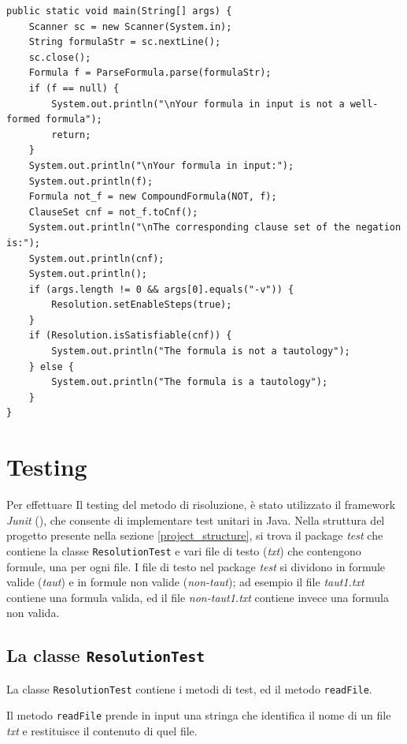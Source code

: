 \documentclass[a4paper,12pt]{report}
\begin{document}
\begin{minipage}{\linewidth}
    \small
    \begin{lstlisting}[caption={Metodo \texttt{main} della classe \texttt{App}}, label={method:main}]
public static void main(String[] args) {
    Scanner sc = new Scanner(System.in);
    String formulaStr = sc.nextLine();
    sc.close();
    Formula f = ParseFormula.parse(formulaStr);
    if (f == null) {
        System.out.println("\nYour formula in input is not a well-formed formula");
        return;
    }
    System.out.println("\nYour formula in input:");
    System.out.println(f);
    Formula not_f = new CompoundFormula(NOT, f);
    ClauseSet cnf = not_f.toCnf();  
    System.out.println("\nThe corresponding clause set of the negation is:");
    System.out.println(cnf);
    System.out.println();
    if (args.length != 0 && args[0].equals("-v")) {
        Resolution.setEnableSteps(true);
    }
    if (Resolution.isSatisfiable(cnf)) {
        System.out.println("The formula is not a tautology");
    } else {
        System.out.println("The formula is a tautology");
    }
}
    \end{lstlisting}
\end{minipage}
% 
% 
\chapter{Testing}
\label{testing}
Per effettuare Il testing del metodo di risoluzione, è stato utilizzato il framework \emph{Junit} (\cite{junit5}), che consente di implementare test unitari in Java. Nella struttura del progetto presente nella sezione \ref{project_structure}, si trova il package \emph{test} che contiene la classe \texttt{ResolutionTest} e vari file di testo (\emph{txt}) che contengono formule, una per ogni file. I file di testo nel package \emph{test} si dividono in formule valide (\emph{taut}) e in formule non valide (\emph{non-taut}); ad esempio il file \emph{taut1.txt} contiene una formula valida, ed il file \emph{non-taut1.txt} contiene invece una formula non valida.

\section{La classe \texttt{ResolutionTest}}
La classe \texttt{ResolutionTest} contiene i metodi di test, ed il metodo \texttt{readFile}.

Il metodo \texttt{readFile} prende in input una stringa che identifica il nome di un file \emph{txt} e restituisce il contenuto di quel file.
\end{document}
